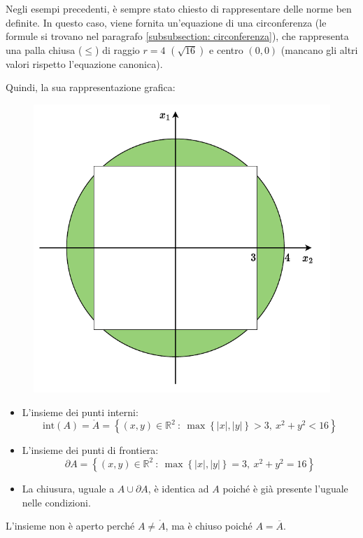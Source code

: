 \documentclass[a4paper]{article}
\begin{document}
	Negli esempi precedenti, è sempre stato chiesto di rappresentare delle norme ben definite. In questo caso, viene fornita un'equazione di una circonferenza (le formule si trovano nel paragrafo \ref{subsubsection: circonferenza}), che rappresenta una palla chiusa ($\le$) di raggio $r = 4$ $\left(\sqrt{16}\right)$ e centro $\left(0,0\right)$ (mancano gli altri valori rispetto l'equazione canonica).\newline

	\noindent
	Quindi, la sua rappresentazione grafica:
	\begin{figure}[!htp]
		\centering
		\includegraphics[width=.7\textwidth]{img/insiemi_aperti-chiusi-4.pdf}
	\end{figure}
	\begin{itemize}
		\item L'insieme dei punti interni:
		\begin{equation*}
			\mathrm{int}\left(A\right) = \mathring{A} =\left\{\left(x,y\right) \in \mathbb{R}^{2} \: : \: \max\left\{|x|, |y|\right\} > 3, \: x^{2}+y^{2} < 16\right\}
		\end{equation*}
		
		\item L'insieme dei punti di frontiera:
		\begin{equation*}
			\partial A = \left\{\left(x,y\right) \in \mathbb{R}^{2} \: : \: \max\left\{|x|, |y|\right\} = 3, \: x^{2}+y^{2} = 16\right\}
		\end{equation*}

		\item La chiusura, uguale a $A \cup \partial A$, è identica ad $A$ poiché è già presente l'uguale nelle condizioni.
	\end{itemize}
	L'insieme non è aperto perché $A \ne \mathring{A}$, ma è chiuso poiché $A = \overline{A}$.
\end{document}
